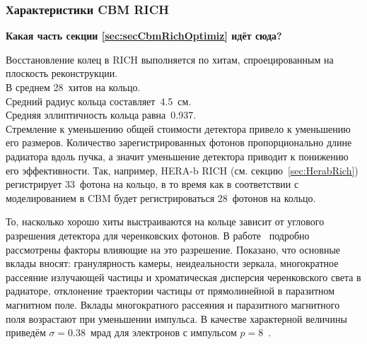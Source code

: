 \subsubsection{Характеристики CBM RICH}\label{sec:CbmRichChar}


\textbf{Какая часть секции \ref{sec:secCbmRichOptimiz} идёт сюда?}

Восстановление колец в RICH выполняется по хитам, спроецированным на плоскость реконструкции.\\
В среднем 28~хитов на кольцо. \\
Средний радиус кольца составляет~4.5~см. \\
Средняя эллиптичность кольца равна~0.937. \\

Стремление к уменьшению общей стоимости детектора привело к уменьшению его размеров. Количество зарегистрированных фотонов пропорционально длине радиатора вдоль пучка, а значит уменьшение детектора приводит к понижению его эффективности.
Так, например, HERA-b RICH (см. секцию~\ref{sec:HerabRich}) регистрирует 33~фотона на кольцо, в то время как в соответствии с моделированием в CBM будет регистрироваться 28~фотонов на кольцо.

То, насколько хорошо хиты выстраиваются на кольце зависит от углового разрешения детектора для черенковских фотонов. В работе~\cite{TDR_RICH, KOPFERDISS} подробно рассмотрены факторы влияющие на это разрешение. Показано, что основные вклады вносят: гранулярность камеры, неидеальности зеркала, многократное рассеяние излучающей частицы и хроматическая дисперсия черенковского света в радиаторе, отклонение траектории частицы от прямолинейной в паразитном магнитном поле.
Вклады многократного рассеяния и паразитного магнитного поля возрастают при уменьшении импульса. В качестве характерной величины приведём $\sigma = 0.38$~мрад для электронов с импульсом $p=8$~\GeVoverC{}.


